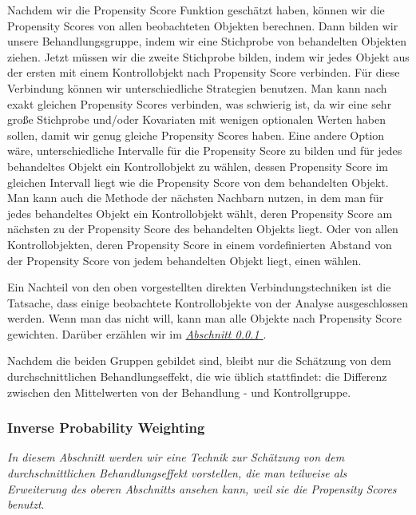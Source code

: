 \documentclass[12pt,a4paper,twoside]{scrartcl}
\numberwithin{equation}{section}
\newcommand{\refsec}[1]{\emph{\hyperref[#1]{Abschnitt \ref*{#1} }}}
\begin{document}
\noindent
Nachdem wir die Propensity Score Funktion geschätzt haben, können wir die Propensity Scores von allen beobachteten Objekten berechnen. Dann bilden wir unsere Behandlungsgruppe, indem wir eine Stichprobe von behandelten Objekten ziehen. Jetzt müssen wir die zweite Stichprobe bilden, indem wir jedes Objekt aus der ersten mit einem Kontrollobjekt nach Propensity Score verbinden. Für diese Verbindung können wir unterschiedliche Strategien benutzen. Man kann nach exakt gleichen Propensity Scores verbinden, was schwierig ist, da wir eine sehr große Stichprobe und/oder Kovariaten mit wenigen optionalen Werten haben sollen, damit wir genug gleiche Propensity Scores haben. Eine andere Option wäre, unterschiedliche Intervalle für die Propensity Score zu bilden und für jedes behandeltes Objekt ein Kontrollobjekt zu wählen, dessen Propensity Score im gleichen Intervall liegt wie die Propensity Score von dem behandelten Objekt. Man kann auch die Methode der nächsten Nachbarn nutzen, in dem man für jedes behandeltes Objekt ein Kontrollobjekt wählt, deren Propensity Score am nächsten zu der Propensity Score des behandelten Objekts liegt. Oder von allen Kontrollobjekten, deren Propensity Score in einem vordefinierten Abstand von der Propensity Score von jedem behandelten Objekt liegt, einen wählen\cite{stuart2010matching}.\par 

\noindent
Ein Nachteil von den oben vorgestellten direkten Verbindungstechniken ist die Tatsache, dass einige beobachtete Kontrollobjekte von der Analyse ausgeschlossen werden. Wenn man das nicht will, kann man alle Objekte nach Propensity Score gewichten. Darüber erzählen wir im \refsec{subsubsec:inverseProbabilityWeighting}. \par

\noindent
Nachdem die beiden Gruppen gebildet sind, bleibt nur die Schätzung von dem durchschnittlichen Behandlungseffekt, die wie üblich stattfindet: die Differenz zwischen den Mittelwerten von der Behandlung - und Kontrollgruppe.
\par 
\subsubsection{Inverse Probability Weighting}\label{subsubsec:inverseProbabilityWeighting}

\noindent
\emph{In diesem Abschnitt werden wir eine Technik zur Schätzung von dem durchschnittlichen Behandlungseffekt vorstellen, die man teilweise als Erweiterung des oberen Abschnitts ansehen kann, weil sie die Propensity Scores benutzt}.
\par
\end{document}
